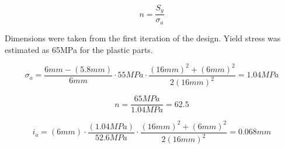 \documentclass[../main.tex]{subfiles}
\begin{document}
\begin{equation}
n=\frac{S_y}{\sigma_a}
\end{equation}

Dimensions were taken from the first iteration of the design. Yield stress was estimated as 65MPa for the plastic parts.

\begin{equation*}
\sigma_a=\frac{6mm-(5.8mm)}{6mm}\cdot{}55MPa\cdot{}
\frac{(16mm)^2+(6mm)^2}{2(16mm)^2}=1.04MPa
\end{equation*}

\begin{equation*}
n=\frac{65MPa}{1.04MPa}=62.5
\end{equation*}

\begin{equation*}
i_a=(6mm)\cdot{}\frac{(1.04MPa)}{52.6MPa}\cdot{}
\frac{(16mm)^2+(6mm)^2}{2(16mm)^2}=0.068mm
\end{equation*}
\end{document}
